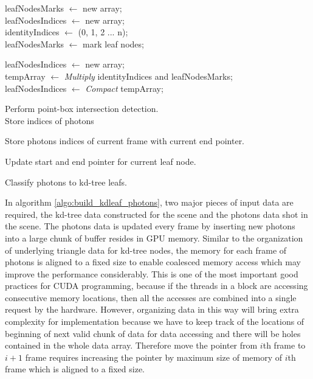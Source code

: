 \begin{spacing}{1.3}

\begin{algorithm}[H]
	\SetAlgoLined

	leafNodesMarks 	\(\leftarrow\) new array; \\
	leafNodesIndices 	\(\leftarrow\) new array; \\
	identityIndices 	\(\leftarrow\) (0, 1, 2 ... n); \\

	 {
		leafNodesMarks \(\leftarrow\) mark leaf nodes; \\
	}

	leafNodesIndices \( \leftarrow \) new array;	 \\
	tempArray \(\leftarrow\) \emph{Multiply} identityIndices and leafNodesMarks; \\
	leafNodesIndices \( \leftarrow \) \emph{Compact} tempArray;
	
	 {
		 {
			Perform point-box intersection detection. \\
			Store indices of photons
		}
	}
	
	 {
		 {
			Store photons indices of current frame with current end pointer.
		}

		Update start and end pointer for current leaf node.
	}
	
	\caption{Classify photons to kd-tree leafs. } 	
	\label{algo:build_kdleaf_photons}
\end{algorithm}

\end{spacing}

\vspace{30pt}

In algorithm \ref{algo:build_kdleaf_photons}, two major pieces of input data are required, the kd-tree data constructed for the scene and the photons data shot in the scene. The photons data is updated every frame by inserting new photons into a large chunk of buffer resides in GPU memory. Similar to the organization of underlying triangle data for kd-tree nodes, the memory for each frame of photons is aligned to a fixed size to enable coalesced memory access which may improve the performance considerably. This is one of the most important good practices for CUDA programming, because if the threads in a block are accessing consecutive memory locations, then all the accesses are combined into a single request by the hardware. However, organizing data in this way will bring extra complexity for implementation because we have to keep track of the locations of beginning of next valid chunk of data for data accessing and there will be holes contained in the whole data array. Therefore move the pointer from \(i\)th frame to \(i+1\) frame requires increasing the pointer by maximum size of memory of \(i\)th frame which is aligned to a fixed size.

